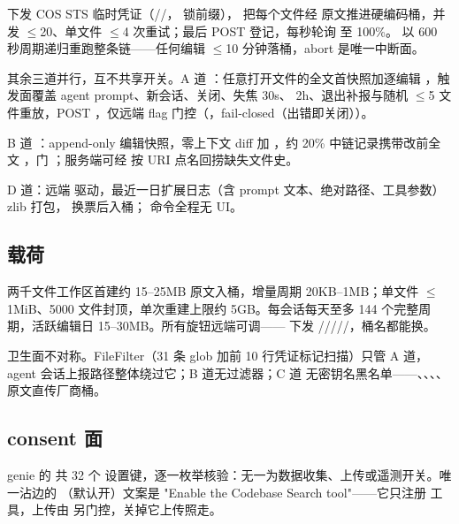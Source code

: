  下发 COS STS 临时凭证（//， 锁前缀）， 把每个文件经  原文推进硬编码桶，并发 $\le$20、单文件 $\le$4 次重试；最后 POST  登记，每秒轮询  至 100\%。 以 600 秒周期递归重跑整条链——任何编辑 $\le$10 分钟落桶，abort 是唯一中断面。

其余三道并行，互不共享开关。A 道 ：任意打开文件的全文首快照加逐编辑 ，触发面覆盖 agent prompt、新会话、关闭、失焦 30s、 2h、退出补报与随机 $\le$5 文件重放，POST ，仅远端  flag 门控（，fail-closed（出错即关闭））。

B 道 ：append-only 编辑快照，零上下文 diff 加 ，约 20\% 中链记录携带改前全文 ，门 ；服务端可经  按 URI 点名回捞缺失文件史。

D 道：远端  驱动，最近一日扩展日志（含 prompt 文本、绝对路径、工具参数）zlib 打包， 换票后入桶； 命令全程无 UI。

\subsection{载荷}

两千文件工作区首建约 15--25MB 原文入桶，增量周期 20KB--1MB；单文件 $\le$1MiB、5000 文件封顶，单次重建上限约 5GB。每会话每天至多 144 个完整周期，活跃编辑日 15--30MB。所有旋钮远端可调—— 下发 /////，桶名都能换。

卫生面不对称。FileFilter（31 条 glob 加前 10 行凭证标记扫描）只管 A 道，agent 会话上报路径整体绕过它；B 道无过滤器；C 道  无密钥名黑名单——、、、、 原文直传厂商桶。

\subsection{consent 面}

genie 的  共 32 个  设置键，逐一枚举核验：无一为数据收集、上传或遥测开关。唯一沾边的 （默认开）文案是 "Enable the Codebase Search tool"——它只注册  工具，上传由  另门控，关掉它上传照走。

